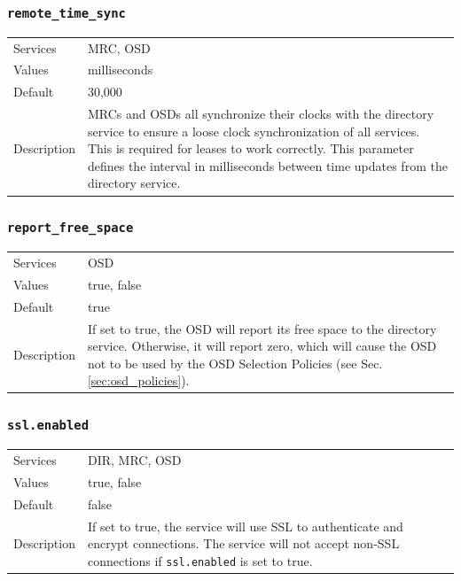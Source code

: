 \documentclass[a4paper,10pt]{book}
\begin{document}
\subsubsection{\texttt{remote\_time\_sync}}
\begin{tabular}{lp{10cm}}
 Services & MRC, OSD\\
 Values   & milliseconds \\
 Default  & 30,000\\
 Description & MRCs and OSDs all synchronize their clocks with the directory service to ensure a loose clock synchronization of all services. This is required for leases to work correctly. This parameter defines the interval in milliseconds between time updates from the directory service.
\end{tabular}

\subsubsection{\texttt{report\_free\_space}}
\begin{tabular}{lp{10cm}}
 Services & OSD\\
 Values   & true, false\\
 Default  & true\\
 Description & If set to true, the OSD will report its free space to the directory service. Otherwise, it will report zero, which will cause the OSD not to be used by the OSD Selection Policies (see Sec. \ref{sec:osd_policies}).
\end{tabular}

\subsubsection{\texttt{ssl.enabled}}
\begin{tabular}{lp{10cm}}
 Services & DIR, MRC, OSD\\
 Values   & true, false \\
 Default  & false \\
 Description & If set to true, the service will use SSL to authenticate and encrypt connections. The service will not accept non-SSL connections if \texttt{ssl.enabled} is set to true.
\end{tabular}
\end{document}

